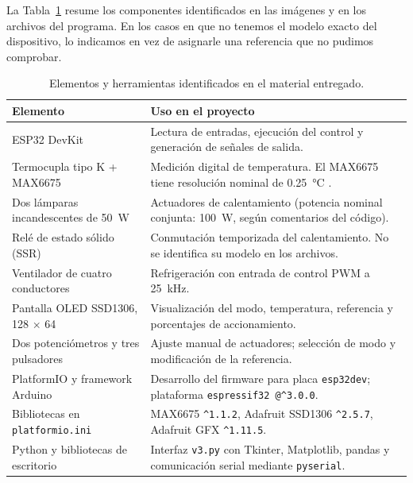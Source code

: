 \documentclass[11pt,letterpaper]{article}
\begin{document}
La Tabla~\ref{tab:materiales} resume los componentes identificados en las imágenes y en los archivos del programa. En los casos en que no tenemos el modelo exacto del dispositivo, lo indicamos en vez de asignarle una referencia que no pudimos comprobar.

\begin{table}[H]
\centering\small
\caption{Elementos y herramientas identificados en el material entregado.}
\label{tab:materiales}
\begin{tabularx}{\textwidth}{@{}p{3.5cm}X@{}}
\toprule
\textbf{Elemento} & \textbf{Uso en el proyecto} \\
\midrule
ESP32 DevKit & Lectura de entradas, ejecución del control y generación de señales de salida. \\
Termocupla tipo K + MAX6675 & Medición digital de temperatura. El MAX6675 tiene resolución nominal de \SI{0.25}{\celsius} \parencite{analog2021}. \\
Dos lámparas incandescentes de \SI{50}{\watt} & Actuadores de calentamiento (potencia nominal conjunta: \SI{100}{\watt}, según comentarios del código). \\
Relé de estado sólido (SSR) & Conmutación temporizada del calentamiento. No se identifica su modelo en los archivos. \\
Ventilador de cuatro conductores & Refrigeración con entrada de control PWM a \SI{25}{\kilo\hertz}. \\
Pantalla OLED SSD1306, \num{128} $\times$ \num{64} & Visualización del modo, temperatura, referencia y porcentajes de accionamiento. \\
Dos potenciómetros y tres pulsadores & Ajuste manual de actuadores; selección de modo y modificación de la referencia. \\
PlatformIO y framework Arduino & Desarrollo del firmware para placa \texttt{esp32dev}; plataforma \texttt{espressif32 @\textasciicircum 3.0.0}. \\
Bibliotecas en \texttt{platformio.ini} & MAX6675 \texttt{\textasciicircum 1.1.2}, Adafruit SSD1306 \texttt{\textasciicircum 2.5.7}, Adafruit GFX \texttt{\textasciicircum 1.11.5}. \\
Python y bibliotecas de escritorio & Interfaz \texttt{v3.py} con Tkinter, Matplotlib, pandas y comunicación serial mediante \texttt{pyserial}. \\
\bottomrule
\end{tabularx}
\end{table}
\end{document}
